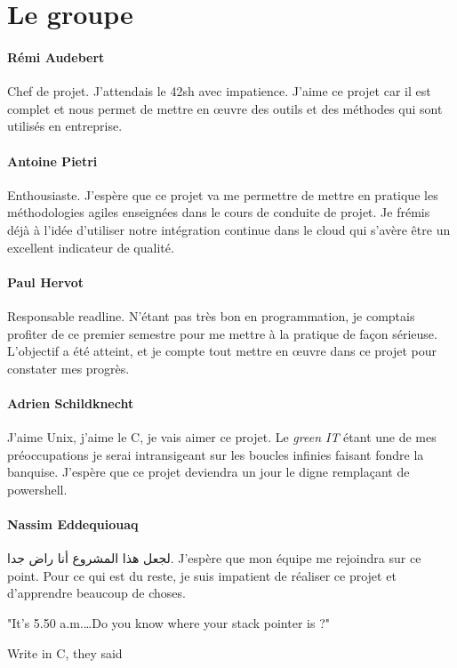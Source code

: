 \section{Le groupe}

\paragraph{Rémi Audebert} Chef de projet. J'attendais le 42sh avec impatience.
J'aime ce projet car il est complet et nous permet de mettre en œuvre des
outils et des méthodes qui sont utilisés en entreprise.

\paragraph{Antoine Pietri} Enthousiaste. J'espère que ce projet va me permettre
de mettre en pratique les méthodologies agiles enseignées dans le cours de
conduite de projet. Je frémis déjà à l'idée d'utiliser notre intégration
continue dans le cloud qui s'avère être un excellent indicateur de qualité.

\paragraph{Paul Hervot} Responsable readline. N'étant pas très bon en
programmation, je comptais profiter de ce premier semestre pour me mettre à la
pratique de façon sérieuse. L'objectif a été atteint, et je compte tout mettre
en œuvre dans ce projet pour constater mes progrès.

\paragraph{Adrien Schildknecht} J'aime Unix, j'aime le C, je vais aimer ce
projet. Le \textit{green IT} étant une de mes préoccupations je serai
intransigeant sur les boucles infinies faisant fondre la banquise.
J'espère que ce projet deviendra un jour le digne remplaçant de powershell.

\paragraph{Nassim Eddequiouaq} لجعل هذا المشروع أنا راض جدا. J’espère que mon
équipe me rejoindra sur ce point. Pour ce qui est du reste, je suis impatient
de réaliser ce projet et d’apprendre beaucoup de choses.

\null
\vfill
\epigraph{
         "It's 5.50 a.m.\ldots Do you know where your stack pointer is ?"
}{Write in C, they said}
